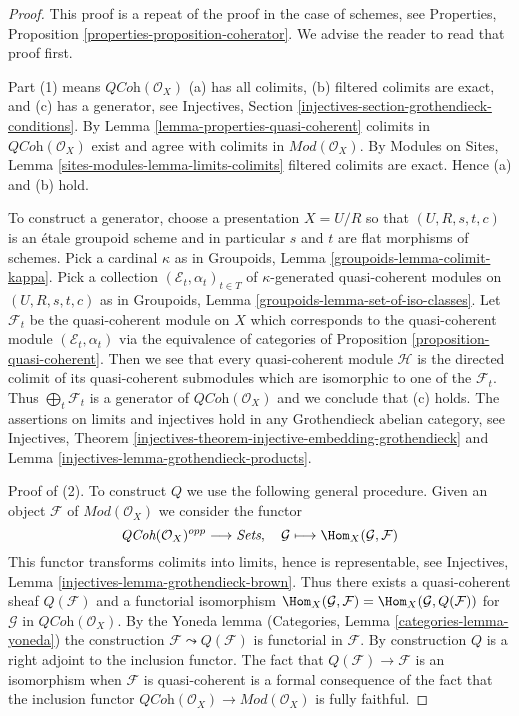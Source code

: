 \begin{proof}
This proof is a repeat of the proof in the case of schemes, see
Properties, Proposition \ref{properties-proposition-coherator}.
We advise the reader to read that proof first.

\medskip\noindent
Part (1) means $\textit{QCoh}(\mathcal{O}_X)$ (a) has all colimits,
(b) filtered colimits are exact, and (c) has a generator, see
Injectives, Section \ref{injectives-section-grothendieck-conditions}.
By Lemma \ref{lemma-properties-quasi-coherent}
colimits in $\textit{QCoh}(\mathcal{O}_X)$ exist and agree
with colimits in $\textit{Mod}(\mathcal{O}_X)$. By
Modules on Sites, Lemma \ref{sites-modules-lemma-limits-colimits}
filtered colimits are exact. Hence (a) and (b) hold.

\medskip\noindent
To construct a generator, choose a presentation $X = U/R$ so that
$(U, R, s, t, c)$ is an
\'etale groupoid scheme and in particular $s$ and $t$ are flat morphisms
of schemes. Pick a cardinal $\kappa$ as in
Groupoids, Lemma \ref{groupoids-lemma-colimit-kappa}.
Pick a collection $(\mathcal{E}_t, \alpha_t)_{t \in T}$ of
$\kappa$-generated quasi-coherent modules on
$(U, R, s, t, c)$ as in
Groupoids, Lemma \ref{groupoids-lemma-set-of-iso-classes}.
Let $\mathcal{F}_t$ be the quasi-coherent module on $X$ which
corresponds to the quasi-coherent module $(\mathcal{E}_t, \alpha_t)$ via
the equivalence of categories of
Proposition \ref{proposition-quasi-coherent}.
Then we see that every quasi-coherent module $\mathcal{H}$ is the
directed colimit of its quasi-coherent submodules which are isomorphic
to one of the $\mathcal{F}_t$. Thus $\bigoplus_t \mathcal{F}_t$ is
a generator of $\textit{QCoh}(\mathcal{O}_X)$ and we conclude that (c) holds.
The assertions on limits and injectives hold in any
Grothendieck abelian category, see
Injectives, Theorem
\ref{injectives-theorem-injective-embedding-grothendieck} and
Lemma \ref{injectives-lemma-grothendieck-products}.

\medskip\noindent
Proof of (2). To construct $Q$ we use the following general procedure.
Given an object $\mathcal{F}$ of $\textit{Mod}(\mathcal{O}_X)$
we consider the functor
$$
\textit{QCoh}(\mathcal{O}_X)^{opp} \longrightarrow \textit{Sets},\quad
\mathcal{G} \longmapsto \Hom_X(\mathcal{G}, \mathcal{F})
$$
This functor transforms colimits into limits,
hence is representable, see
Injectives, Lemma \ref{injectives-lemma-grothendieck-brown}.
Thus there exists a quasi-coherent sheaf $Q(\mathcal{F})$
and a functorial isomorphism
$\Hom_X(\mathcal{G}, \mathcal{F}) = \Hom_X(\mathcal{G}, Q(\mathcal{F}))$
for $\mathcal{G}$ in $\textit{QCoh}(\mathcal{O}_X)$. By the Yoneda lemma
(Categories, Lemma \ref{categories-lemma-yoneda})
the construction $\mathcal{F} \leadsto Q(\mathcal{F})$ is
functorial in $\mathcal{F}$. By construction $Q$ is a right
adjoint to the inclusion functor.
The fact that $Q(\mathcal{F}) \to \mathcal{F}$ is an isomorphism
when $\mathcal{F}$ is quasi-coherent is a formal consequence of the fact
that the inclusion functor
$\textit{QCoh}(\mathcal{O}_X) \to \textit{Mod}(\mathcal{O}_X)$
is fully faithful.
\end{proof}







